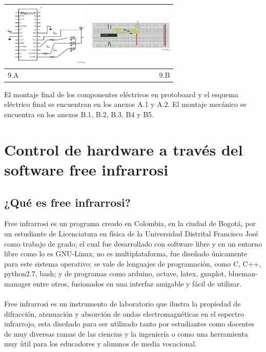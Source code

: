 \documentclass[12]{article}
\newenvironment{Figure}
{\par\medskip\noindent\minipage{\linewidth}}
{\endminipage\par\medskip}
\begin{document}
\begin{multicols}{2}
\begin{Figure}	
\center
\begin{tabular}{|l|r|}
\hline
\includegraphics[width=4cm, height=3cm]{img/rgbesq.png} & \includegraphics[width=4cm, height=3cm]{img/rgbmont.png} \\ \hline
9.A & 9.B \\ \hline
\end{tabular}
\label{fig:g5}
\end{Figure}
\vspace{0.6 cm}

El montaje final de los componentes eléctricos en protoboard y el esquema eléctrico final se encuentran en los anexos A.1 y A.2.
El montaje mecánico se encuentra en los anexos B.1, B.2,  B.3, B4 y B5.

\section{Control de hardware a través del software free infrarrosi}

\subsection{¿Qué es free infrarrosi?}
Free infrarrosi es un  programa creado en Colombia, en la ciudad de Bogotá, por un estudiante de Licenciatura en física de la Universidad Distrital Francisco José como trabajo de grado; el cual fue desarrollado con software libre y en un entorno libre como lo es GNU-Linux, no es multiplataforma, fue diseñado únicamente para este sistema operativo; se vale de lenguajes de programación, como  C, C++, python2.7, bash; y de programas como arduino, octave, latex, gnuplot, blueman-manager entre otros, fusionados en una interfaz amigable y fácil de utilizar. \\\\
Free infrarrosi es un instrumento de laboratorio que ilustra  la propiedad de difracción, atenuación y absorción de ondas electromagnéticas en el espectro infrarrojo, esta diseñado para ser utilizado tanto por  estudiantes como docentes de muy diversas ramas de las ciencias y  la ingeniería o como una herramienta muy útil para los educadores y alumnos de media vocacional.


\end{multicols}
\end{document}
